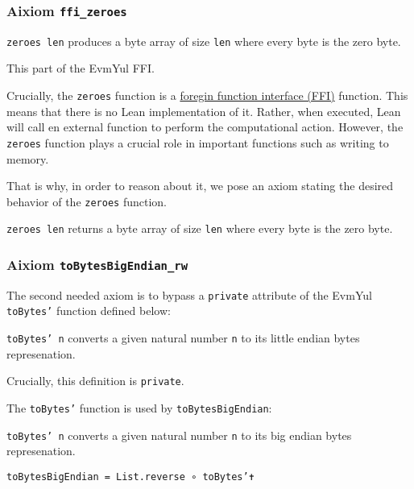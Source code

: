 \subsubsection{\textbf{Aixiom \texttt{ffi_zeroes}}}

\begin{definition}[zeroes]\label{def:zeroes}
\texttt{zeroes len} produces a byte array of size \texttt{len} where every byte
is the zero byte.

This part of the EvmYul FFI.
\end{definition}

Crucially, the \texttt{zeroes} function is a
\href{https://en.wikipedia.org/wiki/Foreign_function_interface}{foregin function interface (FFI)}
function. This means that there is no Lean implementation of it. Rather, when
executed, Lean will call en external function to perform the computational
action.
However, the \texttt{zeroes} function plays a crucial role in important
functions such as writing to memory.

That is why, in order to reason about it, we pose an axiom stating the desired
behavior of the \texttt{zeroes} function.

\begin{theorem}\label{ax:ffi_zeroes}
\texttt{zeroes len} returns a byte array of size \texttt{len} where every byte
is the zero byte.
\end{theorem}

\subsubsection{\textbf{Aixiom \texttt{toBytesBigEndian_rw}}}

The second needed axiom is to bypass a \texttt{private} attribute of the EvmYul
\texttt{toBytes'} function defined below:

\begin{definition}[toBytes']\label{def:toBytes'}\leanok
\texttt{toBytes' n} converts a given natural number \texttt{n} to its little
endian bytes represenation.

Crucially, this definition is \texttt{private}.
\end{definition}

The \texttt{toBytes'} function is used by \texttt{toBytesBigEndian}:

\begin{definition}[toBytesBigEndian]
\label{def:toBytesBigEndian}\leanok
\texttt{toBytes' n} converts a given natural number \texttt{n} to its big
endian bytes represenation.

\texttt{toBytesBigEndian = List.reverse ∘ toBytes'✝}
\end{definition}

